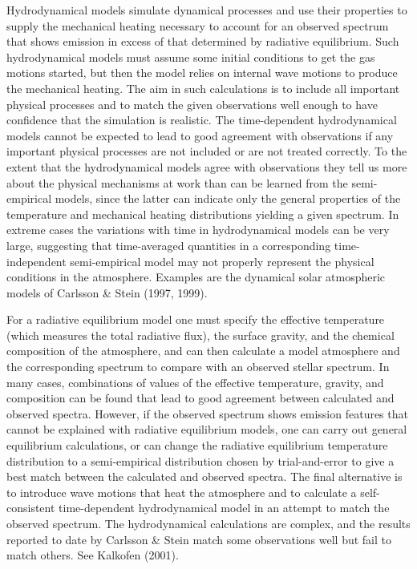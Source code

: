 \documentclass[11pt,twoside]{article}
\begin{document}
Hydrodynamical models simulate dynamical processes and use their properties 
to supply the mechanical heating necessary to account for an 
observed spectrum that shows emission in excess of that determined by 
radiative equilibrium.  Such hydrodynamical models must assume some initial 
conditions to get the gas motions started, but then the model relies on 
internal wave motions to produce the mechanical heating.  The aim in such 
calculations is to include all important physical processes and to match the 
given observations well enough to have confidence that the simulation is
realistic.  The time-dependent hydrodynamical models cannot be expected to lead 
to good agreement with observations if any important physical processes are not 
included or are not treated correctly.  To the extent that the hydrodynamical 
models agree with observations they tell us more about the physical 
mechanisms at work than can be learned from the semi-empirical models, since
the latter can indicate only the general properties of the temperature and 
mechanical heating distributions yielding a given spectrum.  In 
extreme cases the variations with time in hydrodynamical models can be 
very large, suggesting that time-averaged quantities in a corresponding
time-independent semi-empirical model may not properly represent the
physical conditions in the atmosphere.  Examples are the dynamical solar
atmospheric models of Carlsson \& Stein (1997, 1999).

For a radiative equilibrium model one must specify the effective temperature 
(which measures the total radiative flux), the surface gravity, and the 
chemical composition of the atmosphere, and can then calculate a model 
atmosphere and the corresponding spectrum to compare with an observed 
stellar spectrum.  In many cases, combinations of values of the effective
temperature, gravity, and composition can be found that lead to good
agreement between calculated and observed spectra.  However, if the observed
spectrum shows emission features that cannot be explained with radiative
equilibrium models, one can carry out general equilibrium calculations,
or can change the radiative equilibrium temperature distribution to a
semi-empirical distribution chosen by trial-and-error to give a best match 
between the calculated and observed spectra.  The final alternative is to 
introduce wave motions that heat the atmosphere and to calculate a 
self-consistent time-dependent hydrodynamical model in an attempt to match 
the observed spectrum.  The hydrodynamical calculations are complex, 
and the results reported to date by Carlsson \& Stein match some 
observations well but fail to match others.  See Kalkofen (2001).  
\end{document}
